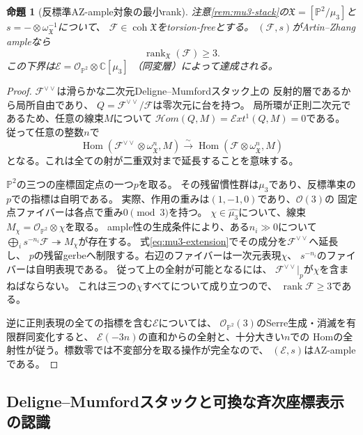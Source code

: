 \documentclass[11pt,a4paper]{ltjsarticle}
\newtheorem{proposition}[theorem]{命題}
\theoremstyle{definition}
\begin{document}
\begin{proposition}[反標準AZ-ample対象の最小rank]
\label{prop:mu3-minimal-rank}
注意\ref{rem:mu3-stack}の$\mathfrak X=[\mathbb P^2/\mu_3]$と
$s=-\otimes\omega_{\mathfrak X}^{-1}$について、
$\mathcal F\in\operatorname{coh}\mathfrak X$をtorsion-freeとする。
$(\mathcal F,s)$がArtin--Zhang ampleなら
\[
 \operatorname{rank}_{\mathfrak X}(\mathcal F)\ge3.
\]
この下界は$\mathcal E=\mathcal O_{\mathbb P^2}\otimes\mathbb C[\mu_3]$
（同変層）によって達成される。
\end{proposition}
\begin{proof}
$\mathcal F^{\vee\vee}$は滑らかな二次元Deligne--Mumfordスタック上の
反射的層であるから局所自由であり、
$Q=\mathcal F^{\vee\vee}/\mathcal F$は零次元に台を持つ。
局所環が正則二次元であるため、任意の線束$M$について
$\mathcal H\!om(Q,M)=\mathcal E\!xt^1(Q,M)=0$である。
従って任意の整数$n$で
\begin{equation}\label{eq:mu3-extension}
 \operatorname{Hom}(\mathcal F^{\vee\vee}\otimes\omega_{\mathfrak X}^{n},M)
 \xrightarrow{\ \sim\ }
 \operatorname{Hom}(\mathcal F\otimes\omega_{\mathfrak X}^{n},M)
\end{equation}
となる。これは全ての射が二重双対まで延長することを意味する。

$\mathbb P^2$の三つの座標固定点の一つ$p$を取る。
その残留慣性群は$\mu_3$であり、反標準束の$p$での指標は自明である。
実際、作用の重みは$(1,-1,0)$であり、$\mathcal O(3)$の
固定点ファイバーは各点で重み$0\pmod3$を持つ。
$\chi\in\widehat{\mu_3}$について、線束
$M_\chi=\mathcal O_{\mathbb P^2}\otimes\chi$を取る。
ample性の生成条件により、ある$n_i\gg0$について
$\bigoplus_i s^{-n_i}\mathcal F\twoheadrightarrow M_\chi$が存在する。
式\eqref{eq:mu3-extension}でその成分を$\mathcal F^{\vee\vee}$へ延長し、
$p$の残留gerbeへ制限する。右辺のファイバーは一次元表現$\chi$、
$s^{-n_i}$のファイバーは自明表現である。
従って上の全射が可能となるには、
$\mathcal F^{\vee\vee}|_p$が$\chi$を含まねばならない。
これは三つの$\chi$すべてについて成り立つので、
$\operatorname{rank}\mathcal F\ge3$である。

逆に正則表現の全ての指標を含む$\mathcal E$については、
$\mathcal O_{\mathbb P^2}(3)$のSerre生成・消滅を有限群同変化すると、
$\mathcal E(-3n)$の直和からの全射と、十分大きい$n$での
Homの全射性が従う。標数零では不変部分を取る操作が完全なので、
$(\mathcal E,s)$はAZ-ampleである。
\end{proof}

\subsection{Deligne--Mumfordスタックと可換な斉次座標表示の認識}
\end{document}
